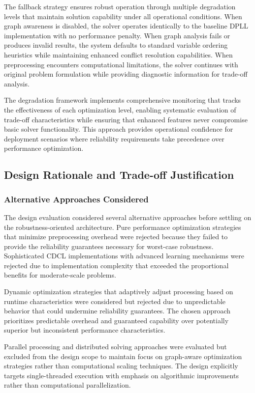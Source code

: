 The fallback strategy ensures robust operation through multiple degradation levels that maintain solution capability under all operational conditions. When graph awareness is disabled, the solver operates identically to the baseline DPLL implementation with no performance penalty. When graph analysis fails or produces invalid results, the system defaults to standard variable ordering heuristics while maintaining enhanced conflict resolution capabilities. When preprocessing encounters computational limitations, the solver continues with original problem formulation while providing diagnostic information for trade-off analysis.

The degradation framework implements comprehensive monitoring that tracks the effectiveness of each optimization level, enabling systematic evaluation of trade-off characteristics while ensuring that enhanced features never compromise basic solver functionality. This approach provides operational confidence for deployment scenarios where reliability requirements take precedence over performance optimization.

\subsection{Design Rationale and Trade-off Justification}

\subsubsection{Alternative Approaches Considered}

The design evaluation considered several alternative approaches before settling on the robustness-oriented architecture. Pure performance optimization strategies that minimize preprocessing overhead were rejected because they failed to provide the reliability guarantees necessary for worst-case robustness. Sophisticated CDCL implementations with advanced learning mechanisms were rejected due to implementation complexity that exceeded the proportional benefits for moderate-scale problems.

Dynamic optimization strategies that adaptively adjust processing based on runtime characteristics were considered but rejected due to unpredictable behavior that could undermine reliability guarantees. The chosen approach prioritizes predictable overhead and guaranteed capability over potentially superior but inconsistent performance characteristics.

Parallel processing and distributed solving approaches were evaluated but excluded from the design scope to maintain focus on graph-aware optimization strategies rather than computational scaling techniques. The design explicitly targets single-threaded execution with emphasis on algorithmic improvements rather than computational parallelization.

